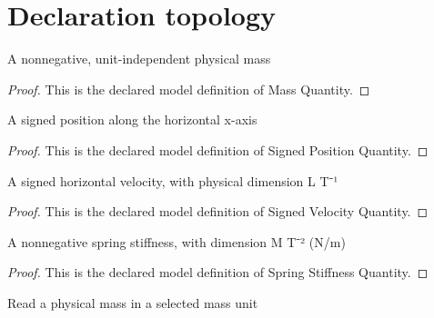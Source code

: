 \section{Declaration topology}
\begin{definition}
  \label{def:physics:phyx-mini-0813:phyxminiproblems-problemphyxmini0813-massquantity}
  A nonnegative, unit-independent physical mass
\end{definition}
\begin{proof}
  This is the declared model definition of Mass Quantity.
\end{proof}
\begin{definition}
  \label{def:physics:phyx-mini-0813:phyxminiproblems-problemphyxmini0813-signedpositionquantity}
  A signed position along the horizontal x-axis
\end{definition}
\begin{proof}
  This is the declared model definition of Signed Position Quantity.
\end{proof}
\begin{definition}
  \label{def:physics:phyx-mini-0813:phyxminiproblems-problemphyxmini0813-signedvelocityquantity}
  A signed horizontal velocity, with physical dimension L T⁻¹
\end{definition}
\begin{proof}
  This is the declared model definition of Signed Velocity Quantity.
\end{proof}
\begin{definition}
  \label{def:physics:phyx-mini-0813:phyxminiproblems-problemphyxmini0813-springstiffnessquantity}
  A nonnegative spring stiffness, with dimension M T⁻² (N/m)
\end{definition}
\begin{proof}
  This is the declared model definition of Spring Stiffness Quantity.
\end{proof}
\begin{definition}
  \label{def:physics:phyx-mini-0813:phyxminiproblems-problemphyxmini0813-massreadout}
  Read a physical mass in a selected mass unit
\end{definition}
